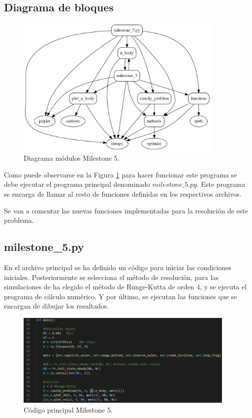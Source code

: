 \documentclass[12pt,a4paper]{article}
\begin{document}
\subsection{Diagrama de bloques}
\begin{figure}[H]
	\centering
	\includegraphics[width=0.90\textwidth]{FIGURES/mil5/codigo/diagram_mil5.JPG}
	\caption{Diagrama módulos Milestone 5.}
	\label{diagram_mil5}
\end{figure}

Como puede observarse en la Figura \ref{diagram_mil5} para hacer funcionar este programa se debe ejecutar el programa principal denominado $milestone\_5.py$. Este programa se encarga de llamar al resto de funciones definidas en los respectivos archivos.

Se van a comentar las nuevas funciones implementadas para la resolución de este problema.


\subsection{milestone\_5.py}
En el archivo principal se ha definido un código para iniciar las condiciones iniciales. Posteriormente se selecciona el método de resolución, para las simulaciones de ha elegido el método de Runge-Kutta de orden 4, y se ejecuta el programa de cálculo numérico. Y por último, se ejecutan las funciones que se encargan de dibujar los resultados.
\begin{figure}[H]
	\centering
	\includegraphics[width=0.95\textwidth]{FIGURES/mil5/codigo/main_1.JPG}
	\caption{Código principal Milestone 5.}
	\label{main_1}
\end{figure}
\end{document}
